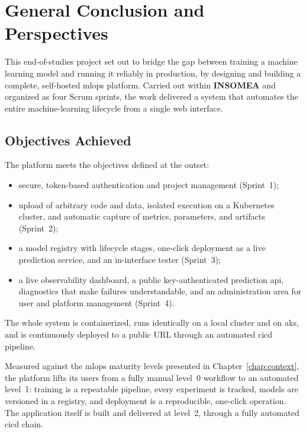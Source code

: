 \chapter*{General Conclusion and Perspectives}

This end-of-studies project set out to bridge the gap between training a machine
learning model and running it reliably in production, by designing and building a
complete, self-hosted \gls{mlops} platform. Carried out within \textbf{INSOMEA}
and organized as four Scrum sprints, the work delivered a system that automates the
entire machine-learning lifecycle from a single web interface.

\section*{Objectives Achieved}
The platform meets the objectives defined at the outset:
\begin{itemize}[leftmargin=1.4em]
  \item secure, token-based authentication and project management
        (Sprint~1);
  \item upload of arbitrary code and data, isolated execution on a Kubernetes
        cluster, and automatic capture of metrics, parameters, and artifacts
        (Sprint~2);
  \item a model registry with lifecycle stages, one-click deployment as a live
        prediction service, and an in-interface tester (Sprint~3);
  \item a live observability dashboard, a public key-authenticated prediction
        \gls{api}, diagnostics that make failures understandable, and an
        administration area for user and platform management (Sprint~4).
\end{itemize}
The whole system is containerized, runs identically on a local cluster and on
\gls{aks}, and is continuously deployed to a public URL through an automated
\gls{cicd} pipeline.

Measured against the \gls{mlops} maturity levels presented in
Chapter~\ref{chap:context}, the platform lifts its users from a fully manual
level~0 workflow to an automated level~1: training is a repeatable pipeline,
every experiment is tracked, models are versioned in a registry, and deployment
is a reproducible, one-click operation. The application itself is built and
delivered at level~2, through a fully automated \gls{cicd} chain.

